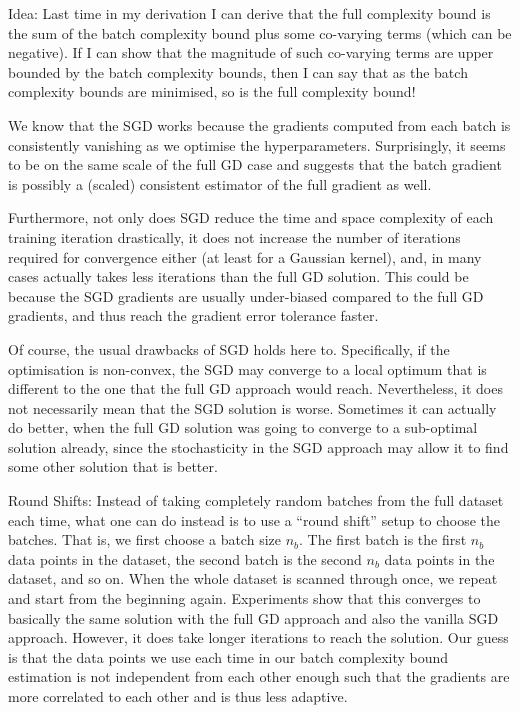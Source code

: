 \documentclass{article}
\begin{document}
		Idea: Last time in my derivation I can derive that the full complexity bound is the sum of the batch complexity bound plus some co-varying terms (which can be negative). If I can show that the magnitude of such co-varying terms are upper bounded by the batch complexity bounds, then I can say that as the batch complexity bounds are minimised, so is the full complexity bound!
		
		We know that the SGD works because the gradients computed from each batch is consistently vanishing as we optimise the hyperparameters. Surprisingly, it seems to be on the same scale of the full GD case and suggests that the batch gradient is possibly a (scaled) consistent estimator of the full gradient as well.
		
		Furthermore, not only does SGD reduce the time and space complexity of each training iteration drastically, it does not increase the number of iterations required for convergence either (at least for a Gaussian kernel), and, in many cases actually takes less iterations than the full GD solution. This could be because the SGD gradients are usually under-biased compared to the full GD gradients, and thus reach the gradient error tolerance faster.
		
		Of course, the usual drawbacks of SGD holds here to. Specifically, if the optimisation is non-convex, the SGD may converge to a local optimum that is different to the one that the full GD approach would reach. Nevertheless, it does not necessarily mean that the SGD solution is worse. Sometimes it can actually do better, when the full GD solution was going to converge to a sub-optimal solution already, since the stochasticity in the SGD approach may allow it to find some other solution that is better.
		
		Round Shifts: Instead of taking completely random batches from the full dataset each time, what one can do instead is to use a ``round shift'' setup to choose the batches. That is, we first choose a batch size $n_{b}$. The first batch is the first $n_{b}$ data points in the dataset, the second batch is the second $n_{b}$ data points in the dataset, and so on. When the whole dataset is scanned through once, we repeat and start from the beginning again. Experiments show that this converges to basically the same solution with the full GD approach and also the vanilla SGD approach. However, it does take longer iterations to reach the solution. Our guess is that the data points we use each time in our batch complexity bound estimation is not independent from each other enough such that the gradients are more correlated to each other and is thus less adaptive.
	
\end{document}

